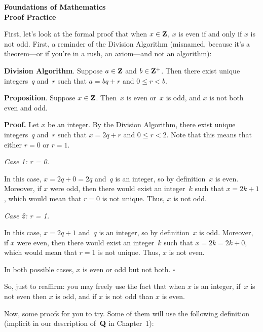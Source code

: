 \documentclass[12pt,letterpaper]{report}
\def\Z{{\bf Z}}
\def\Q{{\bf Q}}
\begin{document}
\begin{center}
{\bf Foundations of Mathematics \\
Proof Practice}\\
\end{center}

First, let's look at the formal proof that when $x\in \Z$, 
$x$ is even if and only if $x$ is not odd.  First, a reminder of the Division Algorithm (misnamed,
because it's a theorem---or if you're in a rush, an axiom---and not an algorithm):

\medskip

\noindent\textbf{Division Algorithm}.
Suppose $a\in\Z$ and $b\in\Z^+$.  Then there exist unique integers~$q$ and~$r$ such that
$a = bq + r$ and $0\leq r < b$.

\medskip

\noindent\textbf{Proposition}.  Suppose $x\in\Z$.  Then~$x$ is even or~$x$ is odd, and $x$ is not both even and odd.

\smallskip

\noindent\textbf{Proof.}  Let $x$ be an integer.  By the Division Algorithm, there exist unique integers~$q$ and~$r$ 
such that $x = 2q + r$ and $0\leq r < 2$.  Note that this means that either $r = 0$ or $r = 1$.

\smallskip

\noindent\textit{Case 1: r = 0.}

In this case, $x = 2q + 0 = 2q$ and~$q$ is an integer, so by definition~$x$ is even.  Moreover, if $x$ were odd,
then there would exist an integer~$k$ such that $x = 2k + 1$, which would mean that $r = 0$ is not unique.  
Thus, $x$ is not odd.

\smallskip

\noindent\textit{Case 2: r = 1.}

In this case, $x = 2q + 1$ and~$q$ is an integer, so by definition~$x$ is odd.  Moreover, if $x$ were even,
then there would exist an integer~$k$ such that $x = 2k = 2k + 0$, which would mean that $r = 1$ is not unique.  
Thus, $x$ is not even.

In both possible cases, $x$ is even or odd but not both.  \hfill$\square$

\bigskip

So, just to reaffirm: you may freely use the fact that when $x$ is an integer, if~$x$ is not even then $x$ is odd, 
and if $x$ is not odd than $x$ is even.

\newpage

Now, some proofs for you to try.  Some of them will use the following definition (implicit in our description of~$\Q$ 
in Chapter~1):
\end{document}

